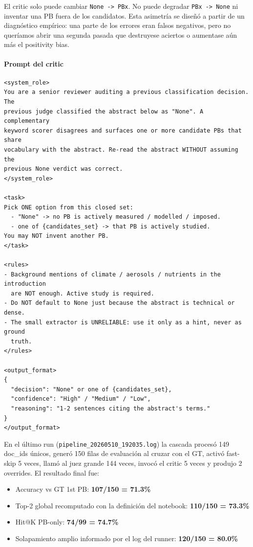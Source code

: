 El critic solo puede cambiar \texttt{None -> PBx}. No puede degradar \texttt{PBx -> None} ni inventar una PB fuera de los candidatos. Esta asimetría se diseñó a partir de un diagnóstico empírico: una parte de los errores eran falsos negativos, pero no queríamos abrir una segunda pasada que destruyese aciertos o aumentase aún más el positivity bias.

\paragraph*{Prompt del critic}

{\footnotesize
\begin{verbatim}
<system_role>
You are a senior reviewer auditing a previous classification decision. The
previous judge classified the abstract below as "None". A complementary
keyword scorer disagrees and surfaces one or more candidate PBs that share
vocabulary with the abstract. Re-read the abstract WITHOUT assuming the
previous None verdict was correct.
</system_role>

<task>
Pick ONE option from this closed set:
  - "None" -> no PB is actively measured / modelled / imposed.
  - one of {candidates_set} -> that PB is actively studied.
You may NOT invent another PB.
</task>

<rules>
- Background mentions of climate / aerosols / nutrients in the introduction
  are NOT enough. Active study is required.
- Do NOT default to None just because the abstract is technical or dense.
- The small extractor is UNRELIABLE: use it only as a hint, never as ground
  truth.
</rules>

<output_format>
{
  "decision": "None" or one of {candidates_set},
  "confidence": "High" / "Medium" / "Low",
  "reasoning": "1-2 sentences citing the abstract's terms."
}
</output_format>
\end{verbatim}
}

En el último run (\texttt{pipeline\_20260510\_192035.log}) la cascada procesó 149 doc\_ids únicos, generó 150 filas de evaluación al cruzar con el GT, activó fast-skip 5 veces, llamó al juez grande 144 veces, invocó el critic 5 veces y produjo 2 overrides. El resultado final fue:

\begin{itemize}
\item Accuracy vs GT 1st PB: \textbf{107/150 = 71.3\%}
\item Top-2 global recomputado con la definición del notebook: \textbf{110/150 = 73.3\%}
\item Hit@K PB-only: \textbf{74/99 = 74.7\%}
\item Solapamiento amplio informado por el log del runner: \textbf{120/150 = 80.0\%}
\end{itemize}

